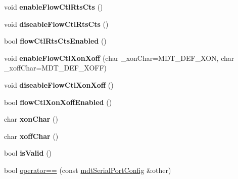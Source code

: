 \begin{DoxyCompactItemize}
\item 
\hypertarget{classmdt_serial_port_config_accac127fab319e881a0461f76a97362c}{
void {\bfseries enableFlowCtlRtsCts} ()}
\label{classmdt_serial_port_config_accac127fab319e881a0461f76a97362c}

\item 
\hypertarget{classmdt_serial_port_config_a5f0af023613beabc6aeb527b280ae5c2}{
void {\bfseries diseableFlowCtlRtsCts} ()}
\label{classmdt_serial_port_config_a5f0af023613beabc6aeb527b280ae5c2}

\item 
\hypertarget{classmdt_serial_port_config_a5933c0d69ed0b710bb578efbca2eb25d}{
bool {\bfseries flowCtlRtsCtsEnabled} ()}
\label{classmdt_serial_port_config_a5933c0d69ed0b710bb578efbca2eb25d}

\item 
\hypertarget{classmdt_serial_port_config_a824c3fb24948eb13f1aedbc25e056b76}{
void {\bfseries enableFlowCtlXonXoff} (char \_\-xonChar=MDT\_\-DEF\_\-XON, char \_\-xoffChar=MDT\_\-DEF\_\-XOFF)}
\label{classmdt_serial_port_config_a824c3fb24948eb13f1aedbc25e056b76}

\item 
\hypertarget{classmdt_serial_port_config_a1ae8683186b22de6cb1faa23191c1403}{
void {\bfseries diseableFlowCtlXonXoff} ()}
\label{classmdt_serial_port_config_a1ae8683186b22de6cb1faa23191c1403}

\item 
\hypertarget{classmdt_serial_port_config_a19821c3f084fb9de5072b4cf180394eb}{
bool {\bfseries flowCtlXonXoffEnabled} ()}
\label{classmdt_serial_port_config_a19821c3f084fb9de5072b4cf180394eb}

\item 
\hypertarget{classmdt_serial_port_config_a9d7e1e2be4debecb5e4646f094fa0add}{
char {\bfseries xonChar} ()}
\label{classmdt_serial_port_config_a9d7e1e2be4debecb5e4646f094fa0add}

\item 
\hypertarget{classmdt_serial_port_config_a084f31a0ae6c1488403d3f5af0b1faa1}{
char {\bfseries xoffChar} ()}
\label{classmdt_serial_port_config_a084f31a0ae6c1488403d3f5af0b1faa1}

\item 
\hypertarget{classmdt_serial_port_config_aa9a2f9a5a82a8cb3408dafe83451ecfb}{
bool {\bfseries isValid} ()}
\label{classmdt_serial_port_config_aa9a2f9a5a82a8cb3408dafe83451ecfb}

\item 
\hypertarget{classmdt_serial_port_config_a31680194276513004e91cd3bee85a398}{
bool \hyperlink{classmdt_serial_port_config_a31680194276513004e91cd3bee85a398}{operator==} (const \hyperlink{classmdt_serial_port_config}{mdtSerialPortConfig} \&other)}
\label{classmdt_serial_port_config_a31680194276513004e91cd3bee85a398}


\end{DoxyCompactItemize}
